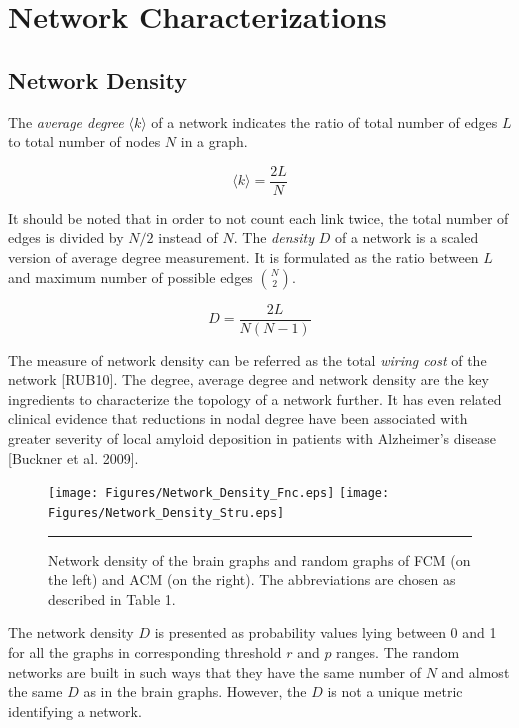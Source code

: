 \section{Network Characterizations}

\subsection{Network Density}
The \textit{average degree} $\langle k \rangle$ of a network indicates the ratio of total number of edges $L$ to total number of nodes $N$ in a graph. 

\begin{equation}
\langle k \rangle = \frac{2L}{N}
\end{equation}

It should be noted that in order to not count each link twice, the total number of edges is divided by $N/2$ instead of $N$. The \textit{density} $D$ of a network is a scaled version of average degree measurement. It is formulated as the ratio between $L$ and maximum number of possible edges ${N \choose 2}$. 

\begin{equation}
D = \frac{2L}{N(N-1)}
\end{equation}	

The measure of network density can be referred as the total \textit{wiring cost} of the network [RUB10]. The degree, average degree and network density are the key ingredients to characterize the topology of a network further. It has even related clinical evidence that reductions in nodal degree have been associated with greater severity of local amyloid deposition in patients with Alzheimer's disease [Buckner et al. 2009]. 

\begin{figure}[htbp]
  \centering
	\texttt{[image: Figures/Network\_Density\_Fnc.eps]}
	\texttt{[image: Figures/Network\_Density\_Stru.eps]}  
    \rule{35em}{0.5pt}
    \caption[Network Density]{Network density of the brain graphs and random graphs of FCM (on the left) and ACM (on the right). The abbreviations are chosen as described in Table 1.}
  \label{fig:Network Density}
\end{figure}


The network density $D$ is presented as probability values lying between 0 and 1 for all the graphs in corresponding threshold $r$ and $p$ ranges. The random networks are built in such ways that they have the same number of $N$ and almost the same $D$ as in the brain graphs. However, the $D$ is not a unique metric identifying a network.

